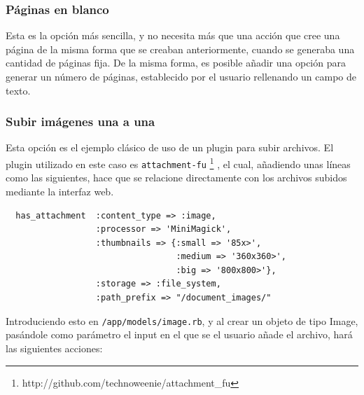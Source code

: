 \subsubsection{Páginas en blanco} %
\label{ssub:paginas_en_blanco}

Esta es la opción más sencilla, y no necesita más que una acción que cree una página de la misma forma que se creaban anteriormente, cuando se generaba una cantidad de páginas fija. De la misma forma, es posible añadir una opción para generar un número de páginas, establecido por el usuario rellenando un campo de texto.


\subsubsection{Subir imágenes una a una} %
\label{ssub:subir_imagenes_una_a_una}

Esta opción es el ejemplo clásico de uso de un plugin para subir archivos. El plugin utilizado en este caso es \texttt{attachment-fu} \footnote{http://github.com/technoweenie/attachment\_fu} , el cual, añadiendo unas líneas como las siguientes, hace que se relacione directamente con los archivos subidos mediante la interfaz web.

\begin{verbatim}
  has_attachment  :content_type => :image,
                  :processor => 'MiniMagick',
                  :thumbnails => {:small => '85x>',
                                  :medium => '360x360>',
                                  :big => '800x800>'},
                  :storage => :file_system,
                  :path_prefix => "/document_images/"
\end{verbatim}

Introduciendo esto en \texttt{/app/models/image.rb}, y al crear un objeto de tipo Image, pasándole como parámetro el input en el que se el usuario añade el archivo, hará las siguientes acciones:

